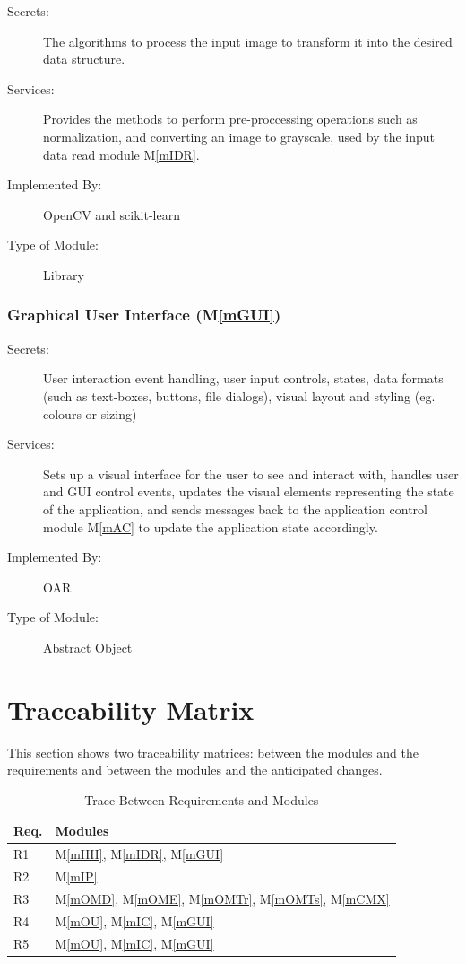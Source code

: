 \documentclass[12pt, titlepage]{article}
\newcommand{\mref}[1]{M\ref{#1}}
\begin{document}
\begin{description}
\item[Secrets:] The algorithms to process the input image to transform it into the desired data structure.
\item[Services:] Provides the methods to perform pre-proccessing operations such as normalization, and converting an image to grayscale,
used by the input data read module \mref{mIDR}.
\item[Implemented By:] OpenCV and scikit-learn
\item[Type of Module:] Library
\end{description}

\subsubsection{Graphical User Interface (\mref{mGUI})}

\begin{description}
\item[Secrets:] User interaction event handling, user input controls, states, data formats (such as text-boxes, buttons, file dialogs),
visual layout and styling (eg. colours or sizing)
\item[Services:] Sets up a visual interface for the user to see and interact with, handles user and GUI control events, updates the 
visual elements representing the state of the application, and sends messages back to the application control module \mref{mAC} to update
the application state accordingly.
\item[Implemented By:] OAR
\item[Type of Module:] Abstract Object
\end{description}

\section{Traceability Matrix} \label{SecTM}

This section shows two traceability matrices: between the modules and the
requirements and between the modules and the anticipated changes.

\begin{table}[H]
\centering
\begin{tabular}{p{} p{}}
\toprule
\textbf{Req.} & \textbf{Modules}\\
\midrule
R1 & \mref{mHH}, \mref{mIDR}, \mref{mGUI}\\
R2 & \mref{mIP}\\
R3 & \mref{mOMD}, \mref{mOME}, \mref{mOMTr}, \mref{mOMTs}, \mref{mCMX}\\
R4 & \mref{mOU}, \mref{mIC}, \mref{mGUI}\\
R5 & \mref{mOU}, \mref{mIC}, \mref{mGUI}\\
\bottomrule
\end{tabular}
\caption{Trace Between Requirements and Modules}
\label{TblRT}
\end{table}
\end{document}
